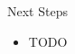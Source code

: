 \begin{block}{Next Steps}
\vspace{-1ex}
{\small
\begin{itemize}
\item TODO
\end{itemize}
}
\vspace{-1ex}
\end{block}
